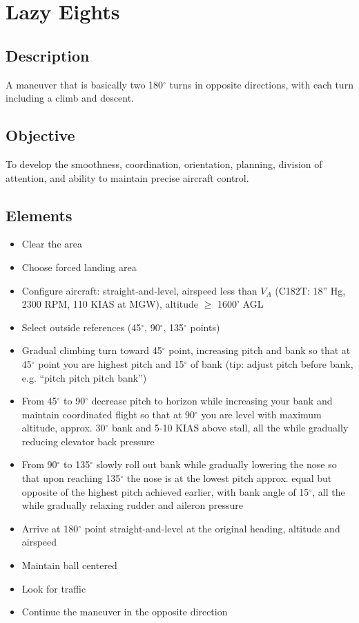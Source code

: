 \section{Lazy Eights}

\subsection{Description}

A maneuver that is basically two 180$^\circ$ turns in opposite directions, with
each turn including a climb and descent.

\subsection{Objective}

To develop the smoothness, coordination, orientation, planning, division of
attention, and ability to maintain precise aircraft control.

\subsection{Elements}

\begin{itemize}
  \item Clear the area
  \item Choose forced landing area
  \item Configure aircraft: straight-and-level, airspeed less than $V_A$
    (C182T: 18'' Hg, 2300 RPM, 110 KIAS at MGW), altitude $\geq$ 1600' AGL 
  \item Select outside references (45$^\circ$, 90$^\circ$, 135$^\circ$ points)
  \item Gradual climbing turn toward 45$^\circ$ point, increasing pitch and
    bank so that at 45$^\circ$ point you are highest pitch and 15$^\circ$ of
    bank (tip: adjust pitch before bank, e.g. ``pitch pitch pitch bank'') 
  \item From 45$^\circ$ to 90$^\circ$ decrease pitch to horizon while
    increasing your bank and maintain coordinated flight so that at 90$^\circ$
    you are level with maximum altitude, approx. 30$^\circ$ bank and 5-10 KIAS
    above stall, all the while gradually reducing elevator back pressure
  \item From 90$^\circ$ to 135$^\circ$ slowly roll out bank while gradually
    lowering the nose so that upon reaching 135$^\circ$ the nose is at the
    lowest pitch approx. equal but opposite of the highest pitch achieved
    earlier, with bank angle of 15$^\circ$, all the while gradually relaxing
    rudder and aileron pressure
  \item Arrive at 180$^\circ$ point straight-and-level at the original heading,
    altitude and airspeed
  \item Maintain ball centered 
  \item Look for traffic
  \item Continue the maneuver in the opposite direction
\end{itemize}

